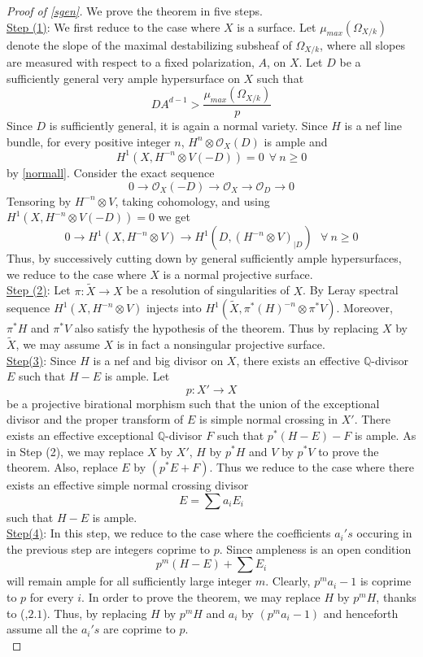 \documentclass[12pt,oneside]{amsart}
\theoremstyle{plain}
\theoremstyle{definition}
\newcommand{\tensor}{\otimes}
\renewcommand{\tilde}{\widetilde}
\newcommand{\sO}{{\mathcal O}}
\newcommand{\Q}{{\mathbb Q}}
\begin{document}
\begin{proof}[Proof of \eqref{sgen}] We prove the theorem in five steps.\\
\noindent \underline{Step (1)}: We first reduce to the case where $X$ is a surface. Let $\mu_{max}(\Omega_{X/k})$ denote the slope of the maximal destabilizing subsheaf of $\Omega_{X/k}$, where all slopes are measured with respect to a fixed polarization, $A$, on $X$. Let $D$ be a sufficiently general very ample hypersurface on $X$ such that 
$$ DA^{d-1}>\frac{\mu_{max}(\Omega_{X/k})}{p}$$
Since $D$ is sufficiently general, it is again a normal variety. Since $H$ is a nef line bundle, for every positive integer $n$, $H^{n}\tensor \sO_X(D)$ is ample and $$H^1(X,H^{-n}\tensor V(-D))=0 \ \ \forall \ n\geq 0$$ by \eqref{normall}. Consider the exact sequence 
$$ 0 \to \sO_X(-D) \to \sO_X \to \sO_D \to 0 $$
Tensoring by $H^{-n}\tensor V$, taking cohomology, and using $H^1(X,H^{-n}\tensor V(-D))=0$ we get 
$$ 0 \to H^1(X, H^{-n}\tensor V) \to H^1(D, \left(H^{-n}\tensor V\right)_{|D}) \ \ \ \forall \ n\geq 0$$
Thus, by successively cutting down by general sufficiently ample hypersurfaces, we reduce to the case where $X$ is a normal projective surface. \\

\noindent \underline{Step (2)}: Let $\pi:\tilde{X}\to X$ be a resolution of singularities of $X$. By Leray spectral sequence $H^1(X, H^{-n}\tensor V)$ injects into $H^1(\tilde{X}, \pi^*(H)^{-n}\tensor \pi^*V)$. Moreover, $\pi^*H$ and $\pi^*V$ also satisfy the hypothesis of the theorem. Thus by replacing $X$ by $\tilde{X}$, we may assume $X$ is in fact a nonsingular projective surface. \\

\noindent \underline{Step(3)}: Since $H$ is a nef and big divisor on $X$, there exists an effective $\Q$-divisor $E$ such that $H-E$ is ample. Let $$p:X'\to X$$ be a projective birational morphism such that the union of the exceptional divisor and the proper transform of $E$ is simple normal crossing in $X'$. There exists an effective exceptional $\Q$-divisor $F$ such that $p^*(H-E)-F$ is ample. As in Step (2), we may replace $X$ by $X'$, $H$ by $p^*H$ and $V$ by $p^*V$ to prove the theorem. Also, replace $E$ by $(p^*E+F)$. Thus we reduce to the case where there exists an effective simple normal crossing divisor 
$$\label{aidef}E=\sum a_i E_i$$ such that $H-E$ is ample. \\

\noindent \underline{Step(4)}: In this step, we reduce to the case where the coefficients $a_i's$ occuring in the previous step are integers coprime to $p$. Since ampleness is an open condition
$$ p^m(H-E) + \sum E_i$$
will remain ample for all sufficiently large integer $m$. Clearly, $p^ma_i-1$ is coprime to $p$ for every $i$. In order to prove the theorem, we may replace $H$ by $p^mH$, thanks to (\cite{szpiro},$2.1$). Thus, by replacing $H$ by $p^mH$ and $a_i$ by $(p^ma_i-1)$ and henceforth assume all the $a_i's$ are coprime to $p$.\\


\end{proof}
\end{document}
